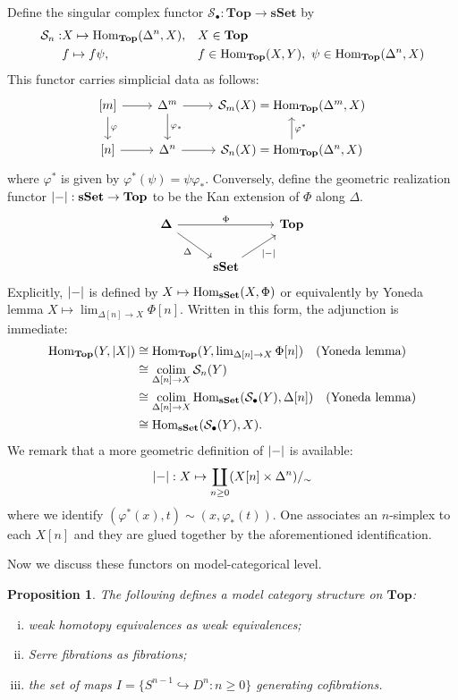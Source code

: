 \documentclass[psamsfonts]{amsart}
\newtheorem{prop}[thm]{Proposition}
\theoremstyle{definition}
\theoremstyle{remark}
\newcommand{\Hom}{\textup{Hom}}
\newcommand{\Top}{\mathbf{Top}}
\newcommand{\sSet}{\mathbf{sSet}}
\DeclareMathOperator*\colim{colim}
\numberwithin{equation}{section}
\begin{document}
Define the singular complex functor $\mathcal{S}_\bullet:\Top\to\sSet$ by
\begin{align*}
\mathcal{S}_n:&X\mapsto\Hom_{\Top}(\Delta^n,X),&&X\in\Top\\
&f\mapsto f\psi,&&f\in\Hom_{\Top}(X,Y),\ \psi\in\Hom_{\Top}(\Delta^n,X)
\end{align*}
This functor carries simplicial data as follows:
\[\begin{tikzcd}
{[m]}\arrow[d,"\varphi"]\arrow[r]&\Delta^m\arrow[r]\arrow[d,"\varphi_\ast"]&\mathcal{S}_m(X)=\Hom_{\Top}(\Delta^m,X)\\
{[n]}\arrow[r]&\Delta^n\arrow[r]&\mathcal{S}_n(X)=\Hom_{\Top}(\Delta^n,X)\arrow[u,"\varphi^\ast"']
\end{tikzcd}\]
where $\varphi^\ast$ is given by $\varphi^\ast(\psi)=\psi\varphi_\ast$. Conversely, define the geometric realization functor $\abs{-}:\sSet\to\Top$ to be the Kan extension of $\Phi$ along $\Delta$.
\[\begin{tikzcd}
\mathbf{\Delta}\arrow[dr,"\Delta"']\arrow[rr,"\Phi"]&&\Top\\
&\sSet\arrow[ur,"\abs{-}"']
\end{tikzcd}\]
Explicitly, $\abs{-}$ is defined by $X\mapsto\Hom_{\sSet}(X,\Phi)$ or equivalently by Yoneda lemma $X\mapsto\lim_{\Delta[n]\to X}\Phi[n]$. Written in this form, the adjunction is immediate:
\begin{align*}
\Hom_{\Top}(Y,\abs{X})&\cong\Hom_{\Top}(Y,\textstyle{\lim_{\Delta[n]\to X}\Phi[n]})\quad\textrm{(Yoneda lemma)}\\
&\cong\colim_{\Delta[n]\to X}\mathcal{S}_n(Y)\\
&\cong\colim_{\Delta[n]\to X}\Hom_{\sSet}(\mathcal{S}_\bullet(Y),\Delta[n])\quad\textrm{(Yoneda lemma)}\\
&\cong\Hom_{\sSet}(\mathcal{S}_\bullet(Y),X).
\end{align*}
We remark that a more geometric definition of $\abs{-}$ is available:
\[\abs{-}:X\mapsto\coprod_{n\geq0}(X[n]\times\Delta^n)/_{\sim}\]
where we identify $(\varphi^\ast(x),t)\sim(x,\varphi_\ast(t))$. One associates an $n$-simplex to each $X[n]$ and they are glued together by the aforementioned identification.\medbreak

Now we discuss these functors on model-categorical level.

\begin{prop}
The following defines a model category structure on $\Top$:
\begin{enumerate}[(i)]
    \item weak homotopy equivalences as weak equivalences;
    \item Serre fibrations as fibrations;
    \item the set of maps $I=\{S^{n-1}\hookrightarrow D^n:n\geq0\}$ generating cofibrations.
\end{enumerate}
\end{prop}
\end{document}
